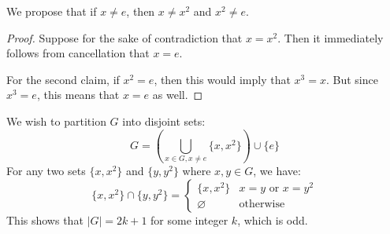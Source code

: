 \begin{sol}
    We propose that if $x \neq e$, then $x \neq x^2$ and $x^2 \neq e$.
    \begin{proof}
        Suppose for the sake of contradiction that $x=x^2$. Then it immediately follows from cancellation that $x=e$.
        \vspace{2mm}

        For the second claim, if $x^2 = e$, then this would imply that $x^3 = x$. But since $x^3=e$, this means that $x=e$ as well.
    \end{proof}
    We wish to partition $G$ into disjoint sets:
    \begin{equation}
        G = \left(\bigcup_{x \in G, x\neq e} \{x,x^2\}\right) \cup \{e\}
    \end{equation}
    For any two sets $\{x,x^2\}$ and $\{y,y^2\}$ where $x,y\in G$, we have:
    \begin{equation}
        \{x,x^2\} \cap \{y,y^2\} = \begin{cases}
            \{x,x^2\} & x=y \text{ or } x=y^2 \\ 
            \varnothing & \text{otherwise}
        \end{cases}
    \end{equation}
    This shows that $|G|=2k+1$ for some integer $k$, which is odd.
\end{sol}